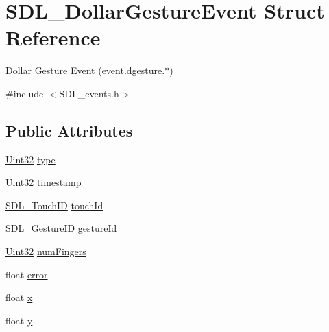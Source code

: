 \hypertarget{struct_s_d_l___dollar_gesture_event}{}\section{S\+D\+L\+\_\+\+Dollar\+Gesture\+Event Struct Reference}
\label{struct_s_d_l___dollar_gesture_event}


Dollar Gesture Event (event.\+dgesture.$\ast$)  




{\ttfamily \#include $<$S\+D\+L\+\_\+events.\+h$>$}

\subsection*{Public Attributes}
\begin{DoxyCompactItemize}
\item 
\mbox{\hyperlink{_s_d_l__stdinc_8h_add440eff171ea5f55cb00c4a9ab8672d}{Uint32}} \mbox{\hyperlink{struct_s_d_l___dollar_gesture_event_ac7f6948754a1b2eb36edde043bf75ce9}{type}}
\item 
\mbox{\hyperlink{_s_d_l__stdinc_8h_add440eff171ea5f55cb00c4a9ab8672d}{Uint32}} \mbox{\hyperlink{struct_s_d_l___dollar_gesture_event_a3bccd8ebdf30b79c0f4074f6471ec583}{timestamp}}
\item 
\mbox{\hyperlink{_s_d_l__touch_8h_a10f5f86abe4ea8308a8706bd5d3b337a}{S\+D\+L\+\_\+\+Touch\+ID}} \mbox{\hyperlink{struct_s_d_l___dollar_gesture_event_a40402f6911ed0dba48e6b23aa02bd83d}{touch\+Id}}
\item 
\mbox{\hyperlink{_s_d_l__gesture_8h_a6c06ab0de82701c94809da9739ff8ac3}{S\+D\+L\+\_\+\+Gesture\+ID}} \mbox{\hyperlink{struct_s_d_l___dollar_gesture_event_a68968438eae9e58208b14e8c954dec31}{gesture\+Id}}
\item 
\mbox{\hyperlink{_s_d_l__stdinc_8h_add440eff171ea5f55cb00c4a9ab8672d}{Uint32}} \mbox{\hyperlink{struct_s_d_l___dollar_gesture_event_a14160d8bad8569f53dd18ed8f64d253f}{num\+Fingers}}
\item 
float \mbox{\hyperlink{struct_s_d_l___dollar_gesture_event_a30aaa8fe0df93615e6692aa20e9c13eb}{error}}
\item 
float \mbox{\hyperlink{struct_s_d_l___dollar_gesture_event_a9888449bd8842ed96494b4db16a6097b}{x}}
\item 
float \mbox{\hyperlink{struct_s_d_l___dollar_gesture_event_a293b2303acc1cfc63c167c5525e6eab5}{y}}
\end{DoxyCompactItemize}


